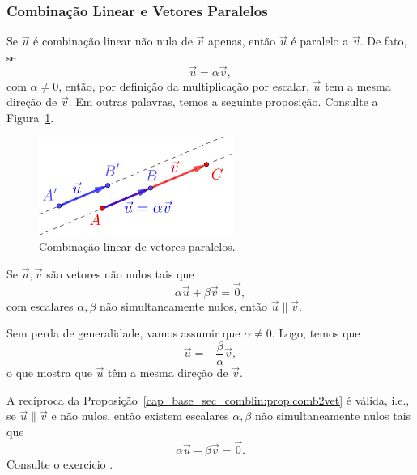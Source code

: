 \subsubsection{Combinação Linear e Vetores Paralelos}

Se $\vec{u}$ é combinação linear não nula de $\vec{v}$ apenas, então $\vec{u}$ é paralelo a $\vec{v}$. De fato, se
\begin{equation}
  \vec{u} = \alpha\vec{v},
\end{equation}
com $\alpha\neq 0$, então, por definição da multiplicação por escalar, $\vec{u}$ tem a mesma direção de $\vec{v}$. Em outras palavras, temos a seguinte proposição. Consulte a Figura~\ref{cap_base_sec_comblin:fig:comb2vet}.

\begin{figure}[h]
  \centering
  \includegraphics[width=2.5in]{./cap_base/dados/fig_comb2vet/fig.jpg}
  \caption{Combinação linear de vetores paralelos.}
  \label{cap_base_sec_comblin:fig:comb2vet}
\end{figure}

\begin{proposicao}\label{cap_base_sec_comblin:prop:comb2vet}
  Se $\vec{u},\vec{v}$ são vetores não nulos tais que
  \begin{equation}
    \alpha\vec{u} + \beta\vec{v} = \vec{0},
  \end{equation}
  com escalares $\alpha,\beta$ não simultaneamente nulos, então $\vec{u}\parallel \vec{v}$.
\end{proposicao}
\begin{demonstracao}
  Sem perda de generalidade, vamos assumir que $\alpha\neq 0$. Logo, temos que
  \begin{equation}
    \vec{u} = -\frac{\beta}{\alpha}\vec{v},
  \end{equation}
  o que mostra que $\vec{u}$ têm a mesma direção de $\vec{v}$.
\end{demonstracao}

\begin{obs}
  A recíproca da Proposição~\ref{cap_base_sec_comblin:prop:comb2vet} é válida, i.e., se $\vec{u}\parallel\vec{v}$ e não nulos, então existem escalares $\alpha,\beta$ não simultaneamente nulos tais que
  \begin{equation}
    \alpha\vec{u} + \beta\vec{v} = \vec{0}.
  \end{equation}
  Consulte o exercício .
\end{obs}

